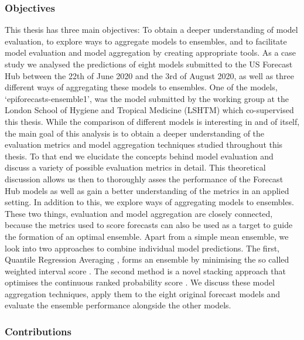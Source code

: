 \documentclass[
]{book}
\begin{document}
\hypertarget{objectives}{%
\subsubsection*{Objectives}\label{objectives}}

This thesis has three main objectives: To obtain a deeper understanding of model evaluation, to explore ways to aggregate models to ensembles, and to facilitate model evaluation and model aggregation by creating appropriate tools. As a case study we analysed the predictions of eight models submitted to the US Forecast Hub between the 22th of June 2020 and the 3rd of August 2020, as well as three different ways of aggregating these models to ensembles. One of the models, `epiforecasts-ensemble1', was the model submitted by the working group at the London School of Hygiene and Tropical Medicine (LSHTM) which co-supervised this thesis. While the comparison of different models is interesting in and of itself, the main goal of this analysis is to obtain a deeper understanding of the evaluation metrics and model aggregation techniques studied throughout this thesis. To that end we elucidate the concepts behind model evaluation and discuss a variety of possible evaluation metrics in detail. This theoretical discussion allows us then to thoroughly asses the performance of the Forecast Hub models as well as gain a better understanding of the metrics in an applied setting. In addition to this, we explore ways of aggregating models to ensembles. These two things, evaluation and model aggregation are closely connected, because the metrics used to score forecasts can also be used as a target to guide the formation of an optimal ensemble. Apart from a simple mean ensemble, we look into two approaches to combine individual model predictions. The first, Quantile Regression Averaging \citep{nowotarskiComputingElectricitySpot2015}, forms an ensemble by minimising the so called weighted interval score \citep{gneitingStrictlyProperScoring2007}. The second method is a novel stacking approach \citep{yaoUsingStackingAverage2018} that optimises the continuous ranked probability score \citep{mathesonScoringRulesContinuous1976, gneitingStrictlyProperScoring2007}. We discuss these model aggregation techniques, apply them to the eight original forecast models and evaluate the ensemble performance alongside the other models.

\hypertarget{contributions}{%
\subsubsection*{Contributions}\label{contributions}}
\end{document}
